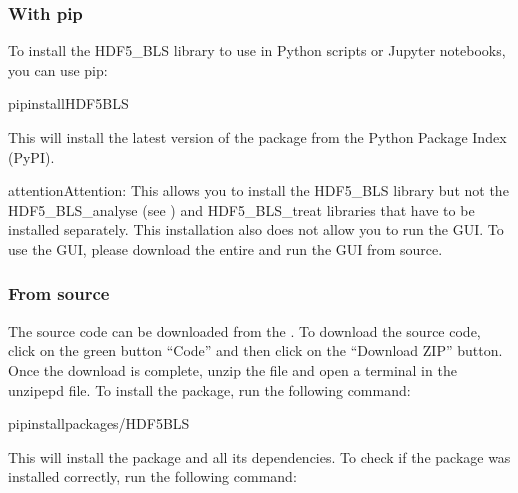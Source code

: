 \documentclass[letterpaper,10pt,english]{sphinxmanual}
\begin{document}
\subsubsection{With pip}
\label{\detokenize{source/hdf5_bls_package:with-pip}}
\sphinxAtStartPar
To install the HDF5\_BLS library to use in Python scripts or Jupyter notebooks, you can use pip:

\begin{sphinxVerbatim}[commandchars=\\\{\}]
pipinstallHDF5\PYGZus{}BLS
\end{sphinxVerbatim}

\sphinxAtStartPar
This will install the latest version of the package from the Python Package Index (PyPI).

\begin{sphinxadmonition}{attention}{Attention:}
\sphinxAtStartPar
This allows you to install the HDF5\_BLS library but not the HDF5\_BLS\_analyse (see ) and HDF5\_BLS\_treat libraries that have to be installed separately. This installation also does not allow you to run the GUI. To use the GUI, please download the entire  and run the GUI from source.
\end{sphinxadmonition}


\subsubsection{From source}
\label{\detokenize{source/hdf5_bls_package:from-source}}
\sphinxAtStartPar
The source code can be downloaded from the . To download the source code, click on the green button “Code” and then click on the “Download ZIP” button. Once the download is complete, unzip the file and open a terminal in the unzipepd file. To install the package, run the following command:

\begin{sphinxVerbatim}[commandchars=\\\{\}]
pipinstallpackages/HDF5\PYGZus{}BLS
\end{sphinxVerbatim}

\sphinxAtStartPar
This will install the package and all its dependencies. To check if the package was installed correctly, run the following command:
\end{document}

